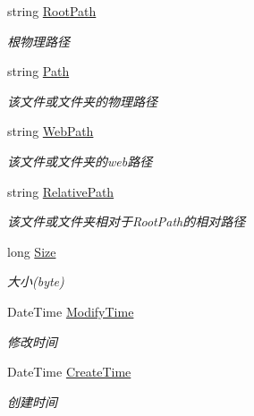 \begin{DoxyCompactItemize}
string \hyperlink{class_x_c_l_net_tools_1_1_entity_1_1_file_info_entity_a6ef4c659747c605379a43168ae1d64f6}{Root\+Path}
\begin{DoxyCompactList}\small\item\em 根物理路径 \end{DoxyCompactList}\item 
string \hyperlink{class_x_c_l_net_tools_1_1_entity_1_1_file_info_entity_a67f485c1a1af6205351305756d515e98}{Path}
\begin{DoxyCompactList}\small\item\em 该文件或文件夹的物理路径 \end{DoxyCompactList}\item 
string \hyperlink{class_x_c_l_net_tools_1_1_entity_1_1_file_info_entity_ab93bd802770bb40cc0abdfd35d2fbbc6}{Web\+Path}
\begin{DoxyCompactList}\small\item\em 该文件或文件夹的web路径 \end{DoxyCompactList}\item 
string \hyperlink{class_x_c_l_net_tools_1_1_entity_1_1_file_info_entity_a795982d186fa2d1ef0e3fb51705f36b2}{Relative\+Path}
\begin{DoxyCompactList}\small\item\em 该文件或文件夹相对于\+Root\+Path的相对路径 \end{DoxyCompactList}\item 
long \hyperlink{class_x_c_l_net_tools_1_1_entity_1_1_file_info_entity_a7447a43994e75793388e160a626ba346}{Size}
\begin{DoxyCompactList}\small\item\em 大小(byte) \end{DoxyCompactList}\item 
Date\+Time \hyperlink{class_x_c_l_net_tools_1_1_entity_1_1_file_info_entity_a64c6633bec7e4d547632c122dbaad9f8}{Modify\+Time}
\begin{DoxyCompactList}\small\item\em 修改时间 \end{DoxyCompactList}\item 
Date\+Time \hyperlink{class_x_c_l_net_tools_1_1_entity_1_1_file_info_entity_a93fc7b2a3119885d9449d1817e7306ca}{Create\+Time}
\begin{DoxyCompactList}\small\item\em 创建时间 \end{DoxyCompactList}\end{DoxyCompactItemize}


